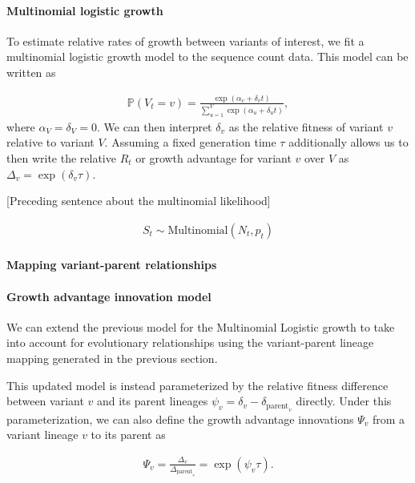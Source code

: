 \documentclass[12pt,oneside,letterpaper]{article}
\begin{document}
\paragraph{Multinomial logistic growth}

To estimate relative rates of growth between variants of interest, we fit a multinomial logistic growth model to the sequence count data.
This model can be written as

\begin{align*}
    \mathbb{P}(V_{t} = v) = \frac{\exp(\alpha_{v} + \delta_{v} t)}{\sum_{u=1}^{V} \exp(\alpha_{u} + \delta_{u} t)},
\end{align*}
where $\alpha_{V} = \delta_{V} = 0$.
We can then interpret $\delta_{v}$ as the relative fitness of variant $v$ relative to variant $V$.
Assuming a fixed generation time $\tau$ additionally allows us to then write the relative $R_{t}$ or growth advantage for variant $v$ over $V$ as $\Delta_{v} = \exp(\delta_{v}\tau)$.

[Preceding sentence about the multinomial likelihood]

\begin{align*}
    S_{t} \sim \text{Multinomial}(N_{t}, p_{t})
\end{align*}

\paragraph{Mapping variant-parent relationships}%


\paragraph{Growth advantage innovation model}%

We can extend the previous model for the Multinomial Logistic growth to take into account for evolutionary relationships using the variant-parent lineage mapping generated in the previous section.

This updated model is instead parameterized by the relative fitness difference between variant $v$ and its parent lineages $\psi_{v} = \delta_{v} - \delta_{\text{parent}_{v}}$ directly.
Under this parameterization, we can also define the  growth advantage innovations $\Psi_{v}$ from a variant lineage $v$ to its parent as

\begin{align*}
\Psi_{v} = \frac{\Delta_{v}}{\Delta_{\text{parent}_{v}}} = \exp(\psi_{v} \tau).
\end{align*}
\end{document}

